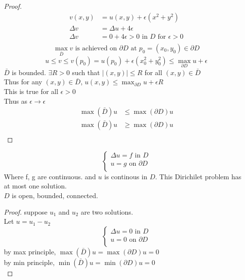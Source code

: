 \documentclass[answers, 12pts,addpoints]{exam}
\begin{document}
\begin{proof}
    \begin{align*}
        v(x,y) &= u(x,y) + \epsilon(x^2 + y^2)\\
        \Delta v &= \Delta u + 4\epsilon\\
        \Delta v &= 0 + 4\epsilon > 0 \text{ in } D \text{ for } \epsilon > 0\\
    \end{align*}
    $$\max_{\bar{D}} v \text{ is achieved on } \partial D \text{ at } p_0 = (x_0,y_0) \in \partial D$$
    $$ u \leq v \leq v(p_0) = u(p_0) + \epsilon(x_0^2 + y_0^2) \leq \max_{\partial D} u + \epsilon$$
    $\bar{D} $ is bounded. $\exists R > 0$ such that $|(x,y)| \leq R$ for all $(x,y) \in \bar{D}$\\
    Thus for any $(x,y) \in \bar{D}$, $u(x,y) \leq \max_{\partial D} u + \epsilon R$\\
    This is true for all $\epsilon > 0$\\
    Thus as $\epsilon \to \epsilon$\\
    \begin{align*}
        \max(\bar{D}) u &\leq \max(\partial D) u\\
        \max(\bar{D}) u &\geq \max(\partial D) u\\
    \end{align*}
\end{proof}
\begin{corollary}[Uniqueness]
    $$\begin{cases}
        \Delta u = f \text{ in } D\\
        u = g \text{ on } \partial D\\
    \end{cases}$$
    Where f, g are continuous. and $u$ is continous in $D$. This Dirichilet problem has at most one solution.\\
    $D$ is open, bounded, connected.\\
    \begin{proof}
        suppose $u_1$ and $u_2$ are two solutions.\\
        Let $u = u_1 - u_2$\\
        $$\begin{cases}
            \Delta u = 0 \text{ in } D\\
            u = 0 \text{ on } \partial D\\
        \end{cases}$$
        by max principle, $\max(\bar{D}) u = \max(\partial D) u = 0$\\
        by min principle, $\min(\bar{D}) u = \min(\partial D) u = 0$\\
    \end{proof}
\end{corollary}
\end{document}
